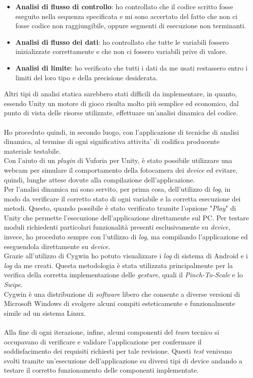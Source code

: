 \begin{itemize}
	\item \textbf{Analisi di flusso di controllo}: ho controllato che il codice scritto fosse eseguito nella sequenza specificata e mi sono accertato del fatto che non ci fosse codice non raggiungibile, oppure segmenti di esecuzione non terminanti.
	\item \textbf{Analisi di flusso dei dati}: ho controllato che tutte le variabili fossero inizializzate correttamente e che non ci fossero variabili prive di valore.
	\item \textbf{Analisi di limite}: ho verificato che tutti i dati da me usati restassero entro i limiti del loro tipo e della precisione desiderata.
\end{itemize}
\noindent
Altri tipi di analisi statica sarebbero stati difficili da implementare, in quanto, essendo Unity un motore di gioco risulta molto pi\`u semplice ed economico, dal punto di vista delle risorse utilizzate, effettuare un'analisi dinamica del codice.\\\\
\noindent
Ho proceduto quindi, in secondo luogo, con l'applicazione di tecniche di analisi dinamica, al termine di ogni significativa attivita' di codifica producente materiale testabile.\\
Con l'aiuto di un \textit{plugin} di Vuforia per Unity, \`e stato possibile utilizzare una webcam per simulare il comportamento della fotocamera dei \textit{device} ed evitare, quindi, lunghe attese dovute alla compilazione dell'applicazione.\\
Per l'analisi dinamica mi sono servito, per prima cosa, dell'utilizzo di \textit{log}, in modo da verificare il corretto stato di ogni variabile e la corretta esecuzione dei metodi. Questo, quando possibile \`e stato verificato tramite l'opzione "\textit{Play}" di Unity che permette l'esecuzione dell'applicazione direttamente sul PC. Per testare moduli richiedenti particolari funzionalit\`a presenti esclusivamente su \textit{device}, invece, ho proceduto sempre con l'utilizzo di \textit{log}, ma compilando l'applicazione ed eseguendola direttamente su \textit{device}.\\
Grazie all'utilizzo di Cygwin ho potuto visualizzare i \textit{log} di sistema di Android e i \textit{log} da me creati. Questa metodologia \`e stata utilizzata principalmente per la verifica della corretta implementazione delle \textit{gesture}, quali il \textit{Pinch-To-Scale} e lo \textit{Swipe}.\\
Cygwin \`e una distribuzione di \textit{software\gloss} libero che consente a diverse versioni di Microsoft Windows di svolgere alcuni compiti esteticamente e funzionalmente simile ad un sistema Linux.\\\\
Alla fine di ogni iterazione, infine, alcuni componenti del \textit{team} tecnico si occupavano di verificare e validare l'applicazione per confermare il soddisfacimento dei requisiti richiesti per tale revisione. Questi \textit{test} venivano svolti tramite un'esecuzione dell'applicazione su diversi tipi di device andando a testare il corretto funzionamento delle componenti implementate.

